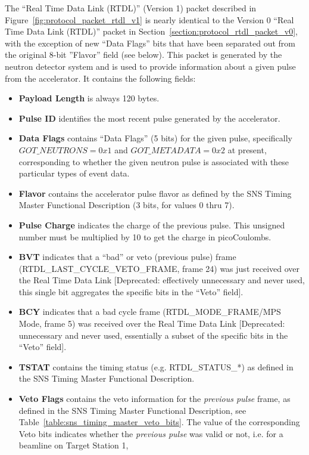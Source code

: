 The ``Real Time Data Link (RTDL)'' (Version 1) packet described in
Figure~\ref{fig:protocol_packet_rtdl_v1}
is nearly identical to the Version 0 ``Real Time Data Link (RTDL)'' packet
in Section~\ref{section:protocol_rtdl_packet_v0},
with the exception of new ``Data Flags'' bits
that have been separated out from the original 8-bit ''Flavor'' field
(see below).
This packet is generated by the neutron
detector system and is used to provide information about a given pulse
from the accelerator.  It contains the following fields:
\begin{itemize}
\item{\bf Payload Length} is always 120 bytes.
\item{\bf Pulse ID} identifies the most recent pulse generated by the
accelerator.
\item{\bf Data Flags} contains ``Data Flags'' (5 bits) for the given pulse,
specifically $ GOT\_NEUTRONS = 0x1 $ and $ GOT\_METADATA = 0x2 $
at present,
corresponding to whether the given neutron pulse is associated with
these particular types of event data.
\item{\bf Flavor} contains the accelerator pulse flavor as defined by
the SNS Timing Master Functional Description
(3 bits, for values 0 thru 7).
\item{\bf Pulse Charge} indicates the charge of the previous pulse. This
unsigned number must be multiplied by 10 to get the charge in picoCoulombs.
\item{\bf BVT} indicates that a ``bad'' or veto (previous pulse) frame
(RTDL\_LAST\_CYCLE\_VETO\_FRAME, frame 24) was just received over the
Real Time Data Link [Deprecated: effectively unnecessary and never used,
this single bit aggregates the specific bits in the ``Veto'' field].
\item{\bf BCY} indicates that a bad cycle frame
(RTDL\_MODE\_FRAME/MPS Mode, frame 5) was received over the
Real Time Data Link
[Deprecated: unnecessary and never used, essentially a subset of the
specific bits in the ``Veto'' field].
\item{\bf TSTAT} contains the timing status
(e.g. RTDL\_STATUS\_*) as defined in the SNS Timing Master
Functional Description.
\item{\bf Veto Flags} contains the veto information
for the {\it previous pulse} frame,
as defined in the SNS Timing Master Functional Description,
see Table~\ref{table:sns_timing_master_veto_bits}.
The value of the corresponding Veto bits indicates whether the
{\it previous pulse} was valid or not,
i.e. for a beamline on Target Station 1,

\end{itemize}
